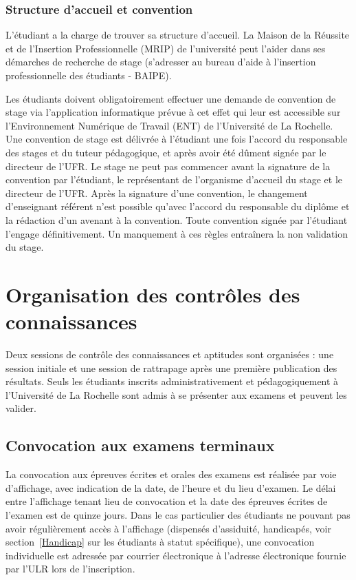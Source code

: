 \documentclass[a4paper,11pt]{article}
\begin{document}
\subsubsection{Structure d'accueil et convention}

L'étudiant a la charge de trouver sa structure d'accueil. La Maison de la Réussite et de l'Insertion Professionnelle (MRIP) de l'université peut l'aider dans ses démarches de recherche de stage (s'adresser au bureau d'aide à l'insertion professionnelle des étudiants - BAIPE).

Les étudiants doivent obligatoirement effectuer une demande de convention de stage via l'application informatique prévue à cet effet qui leur est accessible sur l'Environnement Numérique de Travail (ENT) de l'Université de La Rochelle.
Une convention de stage est délivrée à l'étudiant une fois l'accord du responsable des stages et du tuteur pédagogique, et après avoir été dûment signée par le directeur de l'UFR.
Le stage ne peut pas commencer avant la signature de la convention par l'étudiant, le représentant de l'organisme d'accueil du stage et le directeur de l'UFR. Après la signature d'une convention, le changement d'enseignant référent n'est possible qu'avec l'accord du responsable du diplôme et la rédaction d'un avenant à la convention.
Toute convention signée par l'étudiant l'engage définitivement. Un manquement à ces règles entraînera la non validation du stage.


\section{Organisation des contrôles des connaissances}\label{cc}

Deux sessions de contrôle des connaissances et aptitudes sont organisées : une session initiale et une session de rattrapage après une première publication des résultats. Seuls les étudiants inscrits administrativement et pédagogiquement à l'Université de La Rochelle sont admis à se présenter aux examens et peuvent les valider.

\subsection{Convocation aux examens terminaux}\label{exam}
La convocation aux épreuves écrites et orales des examens est réalisée par voie d'affichage, avec indication de la date, de l'heure et du lieu d'examen. Le délai entre l'affichage tenant lieu de convocation et la date des épreuves écrites de l'examen est de quinze jours.
Dans le cas particulier des étudiants ne pouvant pas avoir régulièrement accès à l'affichage (dispensés d'assiduité, handicapés, voir section~\ref{Handicap} sur les étudiants à statut spécifique), une convocation individuelle est adressée par courrier électronique à l'adresse électronique fournie par l'ULR lors de l'inscription.
\end{document}
